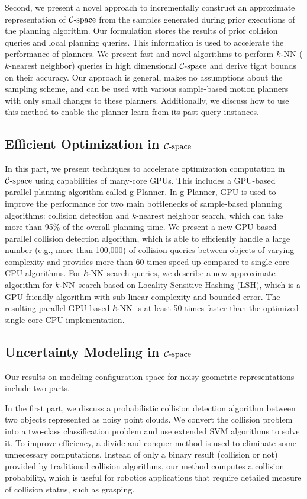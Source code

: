 Second, we present a novel approach to incrementally construct an approximate representation of $\mathcal C\text{-space}$ from the samples generated during prior executions of the planning algorithm. Our formulation stores the results of prior
collision queries and local planning queries. This information is used to accelerate the performance of planners. We present fast and novel algorithms to perform $k\text{-NN}$ ($k$-nearest neighbor) queries in high dimensional $\mathcal C\text{-space}$ and derive tight bounds on their accuracy. Our approach is general, makes no assumptions about the sampling scheme, and can be used with various sample-based motion planners with only small changes to these planners. Additionally, we discuss how to use this method to enable the planner learn from its past query instances.

\subsection{Efficient Optimization in $\mathcal C\text{-space}$}
In this part, we present techniques to accelerate optimization computation in $\mathcal C\text{-space}$ using capabilities of many-core GPUs. This includes a GPU-based parallel planning algorithm called g-Planner. In g-Planner, GPU is used to improve the performance for two main bottlenecks of sample-based planning algorithms: collision detection and $k$-nearest neighbor search, which can take more than 95\% of the overall planning time. We present a new GPU-based parallel collision detection
algorithm, which is able to efficiently handle a large number (e.g., more than 100,000) of collision queries between objects of varying complexity and provides more than 60 times speed up compared to single-core CPU
algorithms. For $k\text{-NN}$ search queries, we describe a new approximate algorithm for $k\text{-NN}$ search based on Locality-Sensitive
Hashing (LSH), which is a GPU-friendly algorithm with sub-linear complexity and bounded error. The resulting
parallel GPU-based $k\text{-NN}$ is at least 50 times faster than the optimized single-core CPU implementation.

\subsection{Uncertainty Modeling in $\mathcal C\text{-space}$}
Our results on modeling configuration space for noisy geometric representations include two parts.

In the first part, we discuss a probabilistic collision detection algorithm between two objects represented as noisy point clouds. We convert the collision problem into a two-class classification problem and use extended SVM algorithms to solve it. To improve efficiency, a divide-and-conquer method is used to eliminate some unnecessary computations. Instead of only a binary result (collision or not) provided by traditional collision algorithms, our method computes a collision probability, which is useful for robotics applications that require detailed measure of collision status, such as grasping.

